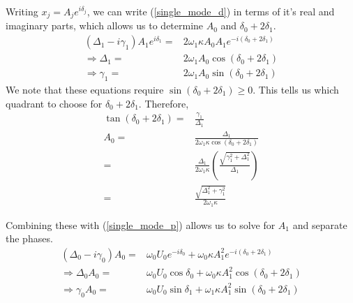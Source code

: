 Writing $x_j = A_j e^{i\delta_j}$, we can write (\ref{single_mode_d}) in terms of it's real and imaginary parts, which allows us to determine $A_0$ and $\delta_0 + 2\delta_1$.
\begin{subequations}
\begin{align}
(\Delta_1 - i \gamma_1) A_1 e^{i\delta_1} = & 2\omega_1\kappa A_0 A_1 e^{-i(\delta_0 + 2\delta_1)} \\
\Rightarrow \Delta_1 = & 2\omega_1 A_0 \cos\left(\delta_0 + 2\delta_1\right) \\
\Rightarrow \gamma_1 = & 2\omega_1 A_0 \sin\left(\delta_0 + 2\delta_1\right)
\end{align}
\end{subequations}
We note that these equations require $\sin(\delta_0 + 2\delta_1) \geq 0$. This tells us which quadrant to choose for $\delta_0 + 2\delta_1$. Therefore,
\begin{subequations}
\begin{align}
\tan\left(\delta_0 + 2\delta_1\right) = & \frac{\gamma_1}{\Delta_1} \label{subeq:single_mode_tan_d}\\
A_0 = & \frac{\Delta_1}{2\omega_1\kappa \cos \left( \delta_0 + 2\delta_1 \right) } \\
    = & \frac{\Delta_1}{2\omega_1\kappa} \left( \frac{ \sqrt{\gamma_1^2 + \Delta_1^2}}{\Delta_1} \right) \\
    = & \frac{\sqrt{\Delta_1^2 + \gamma_1^2}}{2\omega_1\kappa}
\end{align}
\end{subequations}

Combining these with (\ref{single_mode_p}) allows us to solve for $A_1$ and separate the phases.
\begin{subequations}
\begin{align}
(\Delta_0 - i\gamma_0) A_0 = & \omega_0 U_0 e^{-i\delta_0} + \omega_0\kappa A_1^2 e^{-i(\delta_0 + 2\delta_1)} \\
\Rightarrow \Delta_0 A_0 = & \omega_0 U_0 \cos\delta_0 + \omega_0\kappa A_1^2 \cos(\delta_0 + 2\delta_1) \label{subeq:single_mode_p_decomp_r}\\
\Rightarrow \gamma_0 A_0 = & \omega_0 U_0 \sin\delta_1 + \omega_1\kappa A_1^2 \sin(\delta_0 + 2\delta_1) \label{subeq:single_mode_p_decomp_i} 
\end{align}
\end{subequations}

